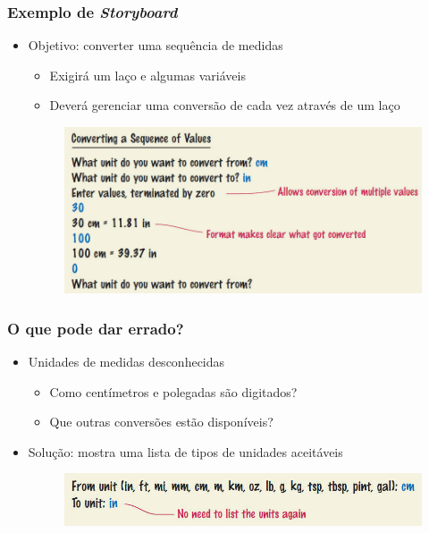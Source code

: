 \documentclass[xcolor={dvipsnames,table},aspectratio=169]{beamer}
\begin{document}
\begin{frame}\frametitle{Exemplo de \emph{Storyboard}}
\begin{itemize}
	\item Objetivo: converter uma sequência de medidas
	\begin{itemize}
		\item Exigirá um laço e algumas variáveis
		\item Deverá gerenciar uma conversão de cada vez através de um laço
	\end{itemize}
\begin{figure}[h]
	\includegraphics[height=0.5\paperheight,center]{pucrs-ep-fprog-unidade_04-lacos-laminas-storyboards1.jpg}
\end{figure}
\end{itemize}
\end{frame}

\begin{frame}\frametitle{O que pode dar errado?}
\begin{itemize}
	\item Unidades de medidas desconhecidas
	\begin{itemize}
		\item Como centímetros e polegadas são digitados?
		\item Que outras conversões estão disponíveis?
	\end{itemize}
	\item Solução: mostra uma lista de tipos de unidades aceitáveis
\begin{figure}[h]
	\includegraphics[height=0.15\paperheight,center]{pucrs-ep-fprog-unidade_04-lacos-laminas-storyboards2.jpg}
\end{figure}
\end{itemize}
\end{frame}
\end{document}
